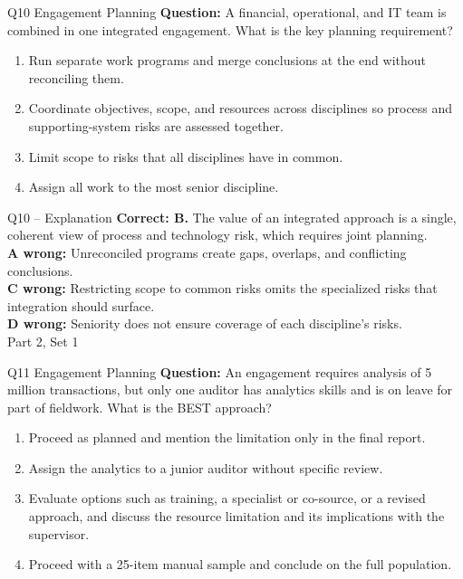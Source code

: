 \documentclass[aspectratio=169,10pt]{beamer}
\begin{document}
\begin{frame}[t]{Q10 \hfill {\scriptsize Engagement Planning}}
	\small
	\textbf{Question:} A financial, operational, and IT team is combined in one integrated engagement. What is the key planning requirement?
	\begin{enumerate}[label=\Alph*.,itemsep=1pt,topsep=3pt]
			\item Run separate work programs and merge conclusions at the end without reconciling them.
			\item Coordinate objectives, scope, and resources across disciplines so process and supporting-system risks are assessed together.
			\item Limit scope to risks that all disciplines have in common.
			\item Assign all work to the most senior discipline.
	\end{enumerate}
\end{frame}
\begin{frame}[t]{Q10 -- Explanation}
	\footnotesize
	\textbf{Correct: B.} The value of an integrated approach is a single, coherent view of process and technology risk, which requires joint planning. \\[5pt]
\textbf{A wrong:} Unreconciled programs create gaps, overlaps, and conflicting conclusions. \\[3pt]
\textbf{C wrong:} Restricting scope to common risks omits the specialized risks that integration should surface. \\[3pt]
\textbf{D wrong:} Seniority does not ensure coverage of each discipline's risks. \\[3pt]
	\vfill {\tiny Part 2, Set 1}
\end{frame}
\begin{frame}[t]{Q11 \hfill {\scriptsize Engagement Planning}}
	\small
	\textbf{Question:} An engagement requires analysis of 5 million transactions, but only one auditor has analytics skills and is on leave for part of fieldwork. What is the BEST approach?
	\begin{enumerate}[label=\Alph*.,itemsep=1pt,topsep=3pt]
			\item Proceed as planned and mention the limitation only in the final report.
			\item Assign the analytics to a junior auditor without specific review.
			\item Evaluate options such as training, a specialist or co-source, or a revised approach, and discuss the resource limitation and its implications with the supervisor.
			\item Proceed with a 25-item manual sample and conclude on the full population.
	\end{enumerate}
\end{frame}
\end{document}

